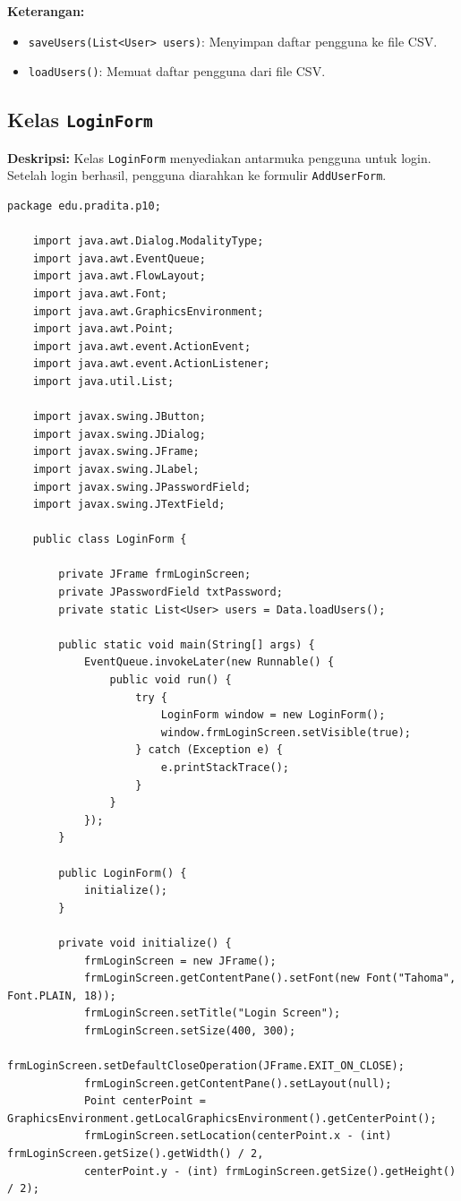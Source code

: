 \textbf{Keterangan:} 
\begin{itemize}
	\item \texttt{saveUsers(List<User> users)}: Menyimpan daftar pengguna ke file CSV.
	\item \texttt{loadUsers()}: Memuat daftar pengguna dari file CSV.
\end{itemize}

\subsection{Kelas \texttt{LoginForm}}

\textbf{Deskripsi:} Kelas \texttt{LoginForm} menyediakan antarmuka pengguna untuk login. Setelah login berhasil, pengguna diarahkan ke formulir \texttt{AddUserForm}.

\begin{lstlisting}[style=JavaStyle]
	package edu.pradita.p10;
	
	import java.awt.Dialog.ModalityType;
	import java.awt.EventQueue;
	import java.awt.FlowLayout;
	import java.awt.Font;
	import java.awt.GraphicsEnvironment;
	import java.awt.Point;
	import java.awt.event.ActionEvent;
	import java.awt.event.ActionListener;
	import java.util.List;
	
	import javax.swing.JButton;
	import javax.swing.JDialog;
	import javax.swing.JFrame;
	import javax.swing.JLabel;
	import javax.swing.JPasswordField;
	import javax.swing.JTextField;
	
	public class LoginForm {
		
		private JFrame frmLoginScreen;
		private JPasswordField txtPassword;
		private static List<User> users = Data.loadUsers();
		
		public static void main(String[] args) {
			EventQueue.invokeLater(new Runnable() {
				public void run() {
					try {
						LoginForm window = new LoginForm();
						window.frmLoginScreen.setVisible(true);
					} catch (Exception e) {
						e.printStackTrace();
					}
				}
			});
		}
		
		public LoginForm() {
			initialize();
		}
		
		private void initialize() {
			frmLoginScreen = new JFrame();
			frmLoginScreen.getContentPane().setFont(new Font("Tahoma", Font.PLAIN, 18));
			frmLoginScreen.setTitle("Login Screen");
			frmLoginScreen.setSize(400, 300);
			frmLoginScreen.setDefaultCloseOperation(JFrame.EXIT_ON_CLOSE);
			frmLoginScreen.getContentPane().setLayout(null);
			Point centerPoint = GraphicsEnvironment.getLocalGraphicsEnvironment().getCenterPoint();
			frmLoginScreen.setLocation(centerPoint.x - (int) frmLoginScreen.getSize().getWidth() / 2,
			centerPoint.y - (int) frmLoginScreen.getSize().getHeight() / 2);
			

\end{lstlisting}
